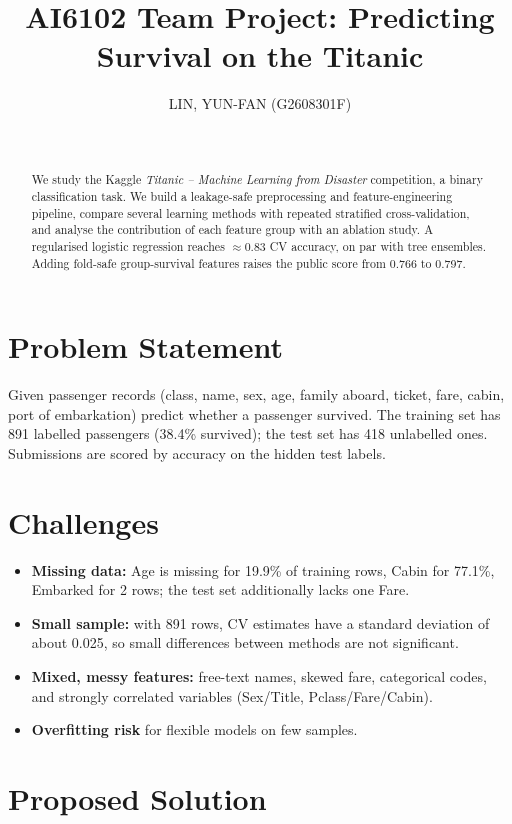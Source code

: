 \documentclass[10pt,twocolumn]{article}
\title{AI6102 Team Project: Predicting Survival on the Titanic}
\author{%
  LIN, YUN-FAN (G2608301F) \and \todo{Member 2: NAME (Matric No.)} \and \todo{Member 3: NAME (Matric No.)}\\
}
\date{}
\begin{document}
\maketitle

\begin{abstract}
We study the Kaggle \emph{Titanic -- Machine Learning from Disaster} competition, a binary classification task.
We build a leakage-safe preprocessing and feature-engineering pipeline, compare several learning methods with repeated
stratified cross-validation, and analyse the contribution of each feature group with an ablation study.
A regularised logistic regression reaches $\approx$0.83 CV accuracy, on par with tree ensembles.
Adding fold-safe group-survival features raises the public score from 0.766 to 0.797.
\end{abstract}

\section{Problem Statement}
Given passenger records (class, name, sex, age, family aboard, ticket, fare, cabin, port of embarkation) predict whether a
passenger survived. The training set has 891 labelled passengers (38.4\% survived); the test set has 418 unlabelled ones.
Submissions are scored by accuracy on the hidden test labels.

\section{Challenges}
\begin{itemize}
  \item \textbf{Missing data:} Age is missing for 19.9\% of training rows, Cabin for 77.1\%, Embarked for 2 rows; the test set additionally lacks one Fare.
  \item \textbf{Small sample:} with 891 rows, CV estimates have a standard deviation of about 0.025, so small differences between methods are not significant.
  \item \textbf{Mixed, messy features:} free-text names, skewed fare, categorical codes, and strongly correlated variables (Sex/Title, Pclass/Fare/Cabin).
  \item \textbf{Overfitting risk} for flexible models on few samples.
\end{itemize}

\section{Proposed Solution}
\end{document}
